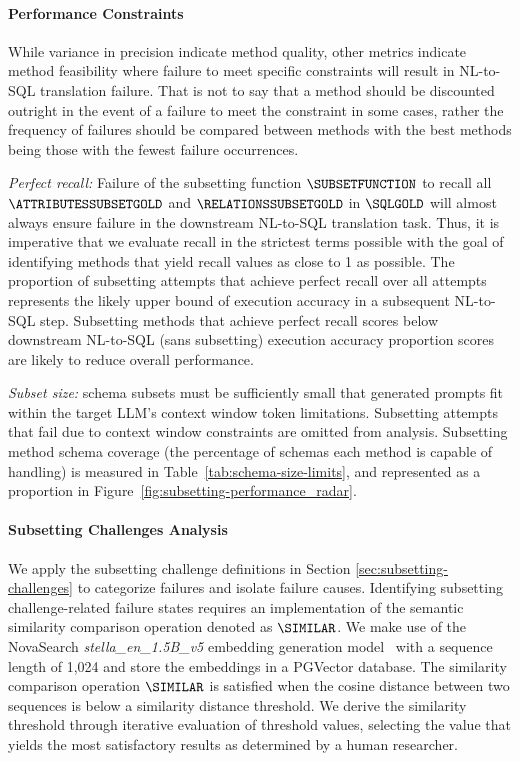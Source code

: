 \paragraph{\textbf{Performance Constraints}}
While variance in precision indicate method quality, other metrics indicate method feasibility where failure to meet specific constraints will result in NL-to-SQL translation failure.
That is not to say that a method should be discounted outright in the event of a failure to meet the constraint in some cases, rather the frequency of failures should be compared between methods with the best methods being those with the fewest failure occurrences.

\emph{Perfect recall:} Failure of the subsetting function $\SUBSETFUNCTION$ to recall all $\ATTRIBUTESSUBSETGOLD$ and $\RELATIONSSUBSETGOLD$ in $\SQLGOLD$ will almost always ensure failure in the downstream NL-to-SQL translation task.
Thus, it is imperative that we evaluate recall in the strictest terms possible with the goal of identifying methods that yield recall values as close to 1 as possible.
The proportion of subsetting attempts that achieve perfect recall over all attempts represents the likely upper bound of execution accuracy in a subsequent NL-to-SQL step.
Subsetting methods that achieve perfect recall scores below downstream NL-to-SQL (sans subsetting) execution accuracy proportion scores are likely to reduce overall performance.  

\emph{Subset size:} schema subsets must be sufficiently small that generated prompts fit within the target LLM's context window token limitations.
Subsetting attempts that fail due to context window constraints are omitted from analysis.
Subsetting method schema coverage (the percentage of schemas each method is capable of handling) is measured in Table~\ref{tab:schema-size-limits}, and represented as a proportion in Figure~\ref{fig:subsetting-performance_radar}.

\paragraph{\textbf{Subsetting Challenges Analysis}}
We apply the subsetting challenge definitions in Section \ref{sec:subsetting-challenges} to categorize failures and isolate failure causes.
Identifying subsetting challenge-related failure states requires an implementation of the semantic similarity comparison operation denoted as $\SIMILAR$. 
We make use of the NovaSearch \emph{stella\_en\_1.5B\_v5} embedding generation model~\cite{zhang2025jasperstelladistillationsota} with a sequence length of 1,024 and store the embeddings in a PGVector database. 
The similarity comparison operation $\SIMILAR$ is satisfied when the cosine distance between two sequences is below a similarity distance threshold. 
We derive the similarity threshold through iterative evaluation of threshold values, selecting the value that yields the most satisfactory results as determined by a human researcher.


